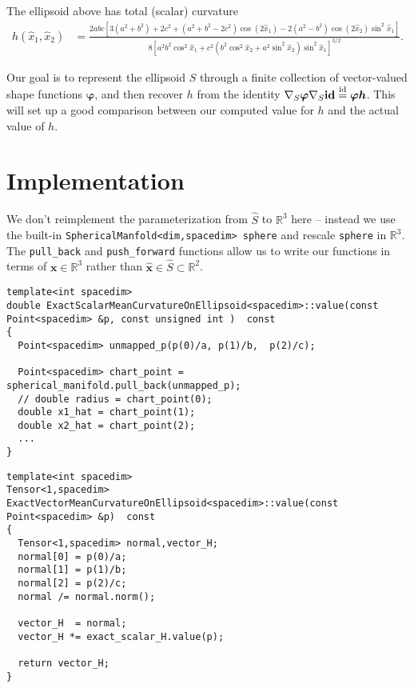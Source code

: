 \documentclass[10pt]{article}
\newcommand{\R}{\mathbb{R}}
\newcommand{\mbf}[1]{\boldsymbol{#1}}
\begin{document}
The ellipsoid above has total (scalar) curvature 
\begin{align*}
   h(\hat{x}_1, \hat{x}_2) &= \frac{2abc\left[ 3(a^2 + b^2) + 2c^2 + (a^2 + b^2 -
   2c^2)\cos(2\hat{x}_1) - 2(a^2 - b^2)\cos(2\hat{x}_2)\sin^2 \hat{x}_1 \right]}
                           {  8\left[a^2 b^2 \cos^2 \hat{x}_1 + c^2(b^2\cos^2 \hat{x}_2 +
                           a^2\sin^2 \hat{x}_2 ) \sin^2 \hat{x}_1
                        \right]^{3/2}}.
\end{align*}

Our goal is to represent the ellipsoid $S$ through a finite collection of
vector-valued shape functions $\boldsymbol{\varphi}$,  and then recover $h$
from the identity $\nabla_S \boldsymbol{\varphi} \nabla_S \text{\bf id}
\overset{\text{id}}{=} \mbf{\varphi}\mbf{h}$.  This will set up a good
comparison between our computed value for $h$ and the actual value of $h$. 


\section*{Implementation}

We don't reimplement the parameterization from $\hat{S}$ to $\R^3$ here -- instead we
use the built-in \texttt{SphericalManfold<dim,spacedim> sphere} and rescale
\texttt{sphere} in $\R^3$.  The
\texttt{pull\_back} and \texttt{push\_forward} functions allow us to write our
functions in terms of $\mbf{x} \in \R^3$ rather than $\hat{\mbf{x}} \in \hat{S}
\subset \R^2$. 

\begin{verbatim}
template<int spacedim>
double ExactScalarMeanCurvatureOnEllipsoid<spacedim>::value(const Point<spacedim> &p, const unsigned int )  const
{
  Point<spacedim> unmapped_p(p(0)/a, p(1)/b,  p(2)/c);

  Point<spacedim> chart_point = spherical_manifold.pull_back(unmapped_p);
  // double radius = chart_point(0); 
  double x1_hat = chart_point(1);
  double x2_hat = chart_point(2);
  ...  
}
\end{verbatim}


\begin{verbatim}
template<int spacedim>
Tensor<1,spacedim> ExactVectorMeanCurvatureOnEllipsoid<spacedim>::value(const Point<spacedim> &p)  const
{
  Tensor<1,spacedim> normal,vector_H;
  normal[0] = p(0)/a;
  normal[1] = p(1)/b;
  normal[2] = p(2)/c;
  normal /= normal.norm();

  vector_H  = normal;
  vector_H *= exact_scalar_H.value(p);

  return vector_H;
}
\end{verbatim}
\end{document}
